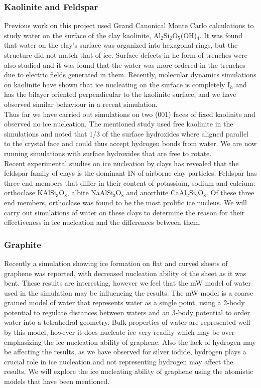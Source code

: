 \documentclass[titlepage]{article}
\begin{document}
\subsubsection{Kaolinite and Feldspar}
\indent Previous work on this project used Grand Canonical Monte Carlo calculations to study water on the surface of the clay kaolinite\cite{CBP08, CBP09, CBP10a, CBP10b}, Al$_{2}$Si$_{2}$O$_{5}$(OH)$_{4}$.  It was found that water on the clay's surface was organized into hexagonal rings, but the structure did not match that of ice.  Surface defects in he form of trenches were also studied and it was found that the water was more ordered in the trenches due to electric fields generated in them.  Recently, molecular dynamics simulations on kaolinite have shown that ice nucleating on the surface is completely I$_{h}$ and has the bilayer oriented perpendicular to the kaolinite surface\cite{CRKSM13}, and we have observed similar behaviour in a recent simulation.\\
\indent Thus far we have carried out simulations on two (001) faces of fixed kaolinite and observed no ice nucleation.  The mentioned study\cite{CRKSM13} used free kaolinite in the simulations and noted that 1/3 of the surface hydroxides where aligned parallel to the crystal face and could thus accept hydrogen bonds from water.  We are now running simulations with surface hydroxides that are free to rotate.\\
\indent Recent experimental studies on ice nucleation by clays has revealed that the feldspar family of clays is the dominant IN of airborne clay particles\cite{A13}.  Feldspar has three end members that differ in their content of potassium, sodium and calcium: orthoclase KAlSi$_{3}$O$_{8}$, albite NaAlSi$_{3}$O$_{8}$ and anorthite CaAl$_{2}$Si$_{2}$O$_{8}$.  Of these three end members, orthoclase was found to be the most prolific ice nucleus.  We will carry out simulations of water on these clays to determine the reason for their effectiveness in ice nucleation and the differences between them.
\subsubsection{Graphite}
	Recently a simulation showing ice formation on flat and curved sheets of graphene was reported\cite{LHM14}, with decreased nucleation ability of the sheet as it was bent.  These results are interesting, however we feel that the mW model of water used in the simulation may be influencing the results.  The mW model is a coarse grained model of water that represents water as a single point, using a 2-body potential to regulate distances between waters and an 3-body potential to order water into a tetrahedral geometry.  Bulk properties of water are represented well by this model, however it does nucleate ice very readily which may be over emphasizing the ice nucleation ability of graphene.  Also the lack of hydrogen may be affecting the results, as we have observed for silver iodide, hydrogen plays a crucial role in ice nucleation and not representing hydrogen may affect the results.  We will explore the ice nucleating ability of graphene using the atomistic models that have been mentioned.
\end{document}
